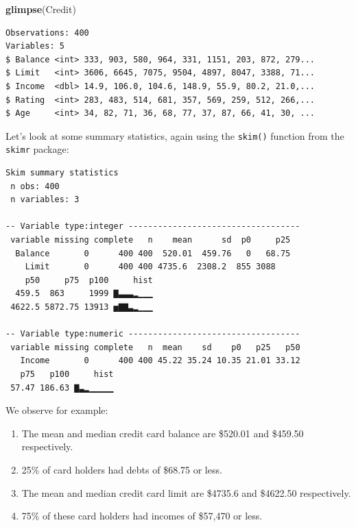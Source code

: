 \documentclass[12pt,]{krantz}
\makeatletter
\newenvironment{Shaded}{\begin{snugshade}}{\end{snugshade}}
\newcommand{\KeywordTok}[1]{\textcolor[rgb]{0.27,0.27,0.27}{\textbf{#1}}}
\newcommand{\StringTok}[1]{\textcolor[rgb]{0.5,0.5,0.5}{#1}}
\newcommand{\OperatorTok}[1]{\textcolor[rgb]{0.43,0.43,0.43}{\textbf{#1}}}
\newcommand{\NormalTok}[1]{#1}
\providecommand{\tightlist}{%
  \setlength{\itemsep}{0pt}\setlength{\parskip}{0pt}}
\newenvironment{kframe}{%
\medskip{}
\setlength{\fboxsep}{.8em}
 \def\at@end@of@kframe{}%
 \ifinner\ifhmode%
  \def\at@end@of@kframe{\end{minipage}}%
  \begin{minipage}{\columnwidth}%
 \fi\fi%
 \def\FrameCommand##1{\hskip\@totalleftmargin \hskip-\fboxsep
 \colorbox{shadecolor}{##1}\hskip-\fboxsep
     \hskip-\linewidth \hskip-\@totalleftmargin \hskip\columnwidth}%
 \MakeFramed {\advance\hsize-\width
   \@totalleftmargin\z@ \linewidth\hsize
   \@setminipage}}%
 {\par\unskip\endMakeFramed%
 \at@end@of@kframe}
\renewenvironment{Shaded}{\begin{kframe}}{\end{kframe}}
\theoremstyle{definition}
\theoremstyle{definition}
\theoremstyle{definition}
\theoremstyle{remark}
\makeatother
\begin{document}
\begin{Shaded}
\begin{Highlighting}[]
\KeywordTok{glimpse}\NormalTok{(Credit)}
\end{Highlighting}
\end{Shaded}

\begin{verbatim}
Observations: 400
Variables: 5
$ Balance <int> 333, 903, 580, 964, 331, 1151, 203, 872, 279...
$ Limit   <int> 3606, 6645, 7075, 9504, 4897, 8047, 3388, 71...
$ Income  <dbl> 14.9, 106.0, 104.6, 148.9, 55.9, 80.2, 21.0,...
$ Rating  <int> 283, 483, 514, 681, 357, 569, 259, 512, 266,...
$ Age     <int> 34, 82, 71, 36, 68, 77, 37, 87, 66, 41, 30, ...
\end{verbatim}

Let's look at some summary statistics, again using the \texttt{skim()}
function from the \texttt{skimr} package:

\begin{Shaded}
\end{Shaded}

\begin{verbatim}
Skim summary statistics
 n obs: 400 
 n variables: 3 

-- Variable type:integer -----------------------------------
 variable missing complete   n    mean      sd  p0     p25
  Balance       0      400 400  520.01  459.76   0   68.75
    Limit       0      400 400 4735.6  2308.2  855 3088   
    p50     p75  p100     hist
  459.5  863     1999 ▇▃▃▃▂▁▁▁
 4622.5 5872.75 13913 ▅▇▇▃▂▁▁▁

-- Variable type:numeric -----------------------------------
 variable missing complete   n  mean    sd    p0   p25   p50
   Income       0      400 400 45.22 35.24 10.35 21.01 33.12
   p75   p100     hist
 57.47 186.63 ▇▃▂▁▁▁▁▁
\end{verbatim}

We observe for example:

\begin{enumerate}
\def\labelenumi{\arabic{enumi}.}
\tightlist
\item
  The mean and median credit card balance are \$520.01 and \$459.50
  respectively.
\item
  25\% of card holders had debts of \$68.75 or less.
\item
  The mean and median credit card limit are \$4735.6 and \$4622.50
  respectively.
\item
  75\% of these card holders had incomes of \$57,470 or less.
\end{enumerate}
\end{document}
